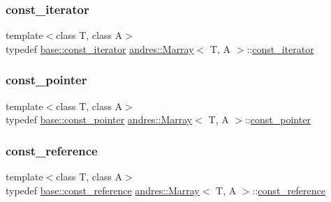 \mbox{\label{classandres_1_1Marray_a0b3be7ebc2bd3a247b59a8ed7be24102}} 
\subsubsection{\texorpdfstring{const\+\_\+iterator}{const\_iterator}}
{\footnotesize\ttfamily template$<$class T, class A$>$ \\
typedef \hyperlink{classandres_1_1View_a7b6f125a7b3830f30cd34887b61858a7}{base\+::const\+\_\+iterator} \hyperlink{classandres_1_1Marray}{andres\+::\+Marray}$<$ T, A $>$\+::\hyperlink{classandres_1_1Marray_a0b3be7ebc2bd3a247b59a8ed7be24102}{const\+\_\+iterator}}

\mbox{\label{classandres_1_1Marray_a6e9d79616cdeed14221d96431ab5f678}} 
\subsubsection{\texorpdfstring{const\+\_\+pointer}{const\_pointer}}
{\footnotesize\ttfamily template$<$class T, class A$>$ \\
typedef \hyperlink{classandres_1_1View_a947d02064bced23437b804a8050e6ccb}{base\+::const\+\_\+pointer} \hyperlink{classandres_1_1Marray}{andres\+::\+Marray}$<$ T, A $>$\+::\hyperlink{classandres_1_1Marray_a6e9d79616cdeed14221d96431ab5f678}{const\+\_\+pointer}}

\mbox{\label{classandres_1_1Marray_ae5ecc2e9f1b747ffaaff04ab15568783}} 
\subsubsection{\texorpdfstring{const\+\_\+reference}{const\_reference}}
{\footnotesize\ttfamily template$<$class T, class A$>$ \\
typedef \hyperlink{classandres_1_1View_a69e3d49e3d8242a33c03d42dd5ecc5b8}{base\+::const\+\_\+reference} \hyperlink{classandres_1_1Marray}{andres\+::\+Marray}$<$ T, A $>$\+::\hyperlink{classandres_1_1Marray_ae5ecc2e9f1b747ffaaff04ab15568783}{const\+\_\+reference}}

